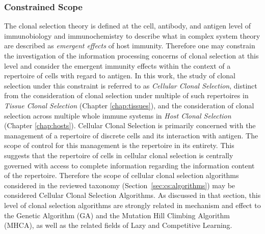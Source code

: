 \subsubsection{Constrained Scope}
The clonal selection theory is defined at the cell, antibody, and antigen level of immunobiology and immunochemistry to describe what in complex system theory are described as \emph{emergent effects} of host immunity. Therefore one may constrain the investigation of the information processing concerns of clonal selection at this level and consider the emergent immunity effects within the context of a repertoire of cells with regard to antigen. In this work, the study of clonal selection under this constraint is referred to as \emph{Cellular Clonal Selection}, distinct from the consideration of clonal selection under multiple of such repertoires in \emph{Tissue Clonal Selection} (Chapter \ref{chap:tissues}), and the consideration of clonal selection across multiple whole immune systems in \emph{Host Clonal Selection} (Chapter \ref{chap:hosts}).
Cellular Clonal Selection is primarily concerned with the management of a repertoire of discrete cells and its interaction with antigen. The scope of control for this management is the repertoire in its entirety. This suggests that the repertoire of cells in cellular clonal selection is centrally governed with access to complete information regarding the information content of the repertoire. Therefore the scope of cellular clonal selection algorithms considered in the reviewed taxonomy (Section~\ref{sec:cs:algorithms}) may be considered Cellular Clonal Selection Algorithms. As discussed in that section, this level of clonal selection algorithms are strongly related in mechanism and effect to the Genetic Algorithm (GA) and the Mutation Hill Climbing Algorithm (MHCA), as well as the related fields of Lazy and Competitive Learning. 

%
%
